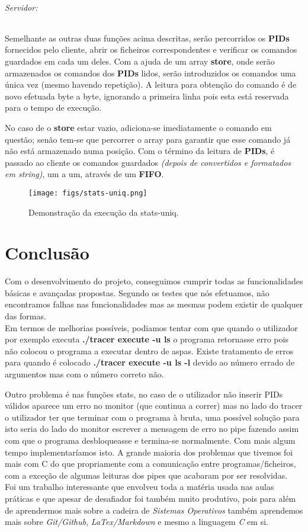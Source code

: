 \documentclass[11.5pt,a4paper]{report}
\begin{document}
\subparagraph{Servidor:}
Semelhante as outras duas funções acima descritas, serão percorridos os \textbf{PIDs} fornecidos pelo cliente, abrir os ficheiros correspondentes e verificar os comandos guardados em cada um deles. Com a ajuda de um array \textbf{store}, onde serão armazenados os comandos dos \textbf{PIDs} lidos, serão introduzidos os comandos uma única vez (mesmo havendo repetição). A leitura para obtenção do comando é de novo efetuada byte a byte, ignorando a primeira linha pois esta está reservada para o tempo de execução.\par
No caso de o \textbf{store} estar vazio, adiciona-se imediatamente o comando em questão; senão tem-se que percorrer o array para garantir que esse comando já não está armazenado numa posição.
Com o término da leitura de \textbf{PIDs}, é passado ao cliente os comandos guardados \textit{(depois de convertidos e formatados em string)}, um a um, através de um \textbf{FIFO}. 

\begin{figure}[h]
    \centering
    \texttt{[image: figs/stats-uniq.png]}
    \caption{Demonstração da execução da stats-uniq.}
    \label{f}
\end{figure}

\newpage
\chapter{Conclusão}
Com o desenvolvimento do projeto, conseguimos cumprir todas as funcionalidades básicas e avançadas propostas. Segundo os testes que nós efetuamos, não encontramos falhas nas funcionalidades mas as mesmas podem existir de qualquer das formas.\\

Em termos de melhorias possíveis, podiamos tentar com que quando o utilizador por exemplo executa \textbf{./tracer execute -u ls} o programa retornasse erro pois não colocou o programa a executar dentro de aspas. Existe tratamento de erros para quando é colocado \textbf{./tracer execute -u ls -l} devido ao número errado de argumentos mas com o número correto não.\par
Outro problema é nas funções stats, no caso de o utilizador não inserir PIDs válidos aparece um erro no monitor (que continua a correr) mas no lado do tracer o utilizador ter que terminar com o programa à bruta, uma possível solução para isto seria do lado do monitor escrever a mensagem de erro no pipe fazendo assim com que o programa desbloqueasse e termina-se normalmente. Com mais algum tempo implementaríamos isto.
A grande maioria dos problemas que tivemos foi mais com C do que propriamente com a comunicação entre programas/ficheiros, com a exceção de algumas leituras dos pipes que acabaram por ser resolvidas.\\

Foi um trabalho interessante que envolveu toda a matéria usada nas aulas práticas e que apesar de desafiador foi também muito produtivo, pois para além de aprendermos mais sobre a cadeira de \textit{Sistemas Operativos} também aprendemos mais sobre \textit{Git/Github}, \textit{LaTex/Markdown} e mesmo a linguagem \textit{C} em si.
\end{document}
